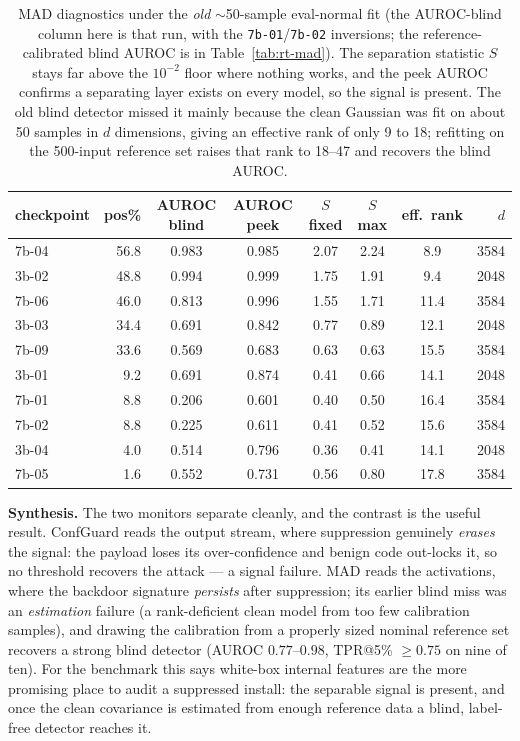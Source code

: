 \documentclass[11pt]{article}
\begin{document}
\begin{table}[H]
\centering
\small
\begin{tabular}{lrcccccr}
\toprule
checkpoint & pos\% & AUROC blind & AUROC peek & $S$ fixed & $S$ max & eff.\ rank & $d$ \\
\midrule
7b-04 & 56.8 & 0.983 & 0.985 & 2.07 & 2.24 & 8.9 & 3584 \\
3b-02 & 48.8 & 0.994 & 0.999 & 1.75 & 1.91 & 9.4 & 2048 \\
7b-06 & 46.0 & 0.813 & 0.996 & 1.55 & 1.71 & 11.4 & 3584 \\
3b-03 & 34.4 & 0.691 & 0.842 & 0.77 & 0.89 & 12.1 & 2048 \\
7b-09 & 33.6 & 0.569 & 0.683 & 0.63 & 0.63 & 15.5 & 3584 \\
3b-01 &  9.2 & 0.691 & 0.874 & 0.41 & 0.66 & 14.1 & 2048 \\
7b-01 &  8.8 & 0.206 & 0.601 & 0.40 & 0.50 & 16.4 & 3584 \\
7b-02 &  8.8 & 0.225 & 0.611 & 0.41 & 0.52 & 15.6 & 3584 \\
3b-04 &  4.0 & 0.514 & 0.796 & 0.36 & 0.41 & 14.1 & 2048 \\
7b-05 &  1.6 & 0.552 & 0.731 & 0.56 & 0.80 & 17.8 & 3584 \\
\bottomrule
\end{tabular}
\caption{MAD diagnostics under the \emph{old} $\sim$50-sample eval-normal fit (the AUROC-blind
column here is that run, with the \texttt{7b-01}/\texttt{7b-02} inversions; the reference-calibrated
blind AUROC is in Table~\ref{tab:rt-mad}). The separation statistic $S$ stays far above the
$10^{-2}$ floor where nothing works, and the peek AUROC confirms a separating layer exists on every
model, so the signal is present. The old blind detector missed it mainly because the clean Gaussian
was fit on about 50 samples in $d$ dimensions, giving an effective rank of only 9 to 18; refitting
on the 500-input reference set raises that rank to 18--47 and recovers the blind AUROC.}
\label{tab:rt-maddiag}
\end{table}

\textbf{Synthesis.} The two monitors separate cleanly, and the contrast is the useful result.
ConfGuard reads the output stream, where suppression genuinely \emph{erases} the signal: the
payload loses its over-confidence and benign code out-locks it, so no threshold recovers the
attack --- a signal failure. MAD reads the activations, where the backdoor signature
\emph{persists} after suppression; its earlier blind miss was an \emph{estimation} failure (a
rank-deficient clean model from too few calibration samples), and drawing the calibration from a
properly sized nominal reference set recovers a strong blind detector (AUROC $0.77$--$0.98$,
TPR@5\% $\geq 0.75$ on nine of ten). For the benchmark this says white-box internal features are
the more promising place to audit a suppressed install: the separable signal is present, and once
the clean covariance is estimated from enough reference data a blind, label-free detector reaches
it.
\end{document}
